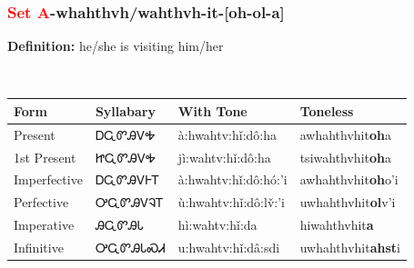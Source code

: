 \subsubsection*{\textcolor{Red}{Set A}{-}\textbf{whahthvh/wahthvh}{-}it{-}[oh-ol-a]}
\nopagebreak
\textbf{Definition: } he/she is visiting him/her
\\[0.5em]
\begin{tabularx}{\textwidth}{l X X X}%
\toprule%
\textbf{Form}&\textbf{Syllabary}&\textbf{With Tone}&\textbf{Toneless}\\%
\midrule%
Present&ᎠᏩᏛᎯᏙᎭ&à:hwahtv:hǐ:dô:ha&awhahthvhit\textbf{oh}a\\%
1st Present&ᏥᏩᏛᎯᏙᎭ&jì:wahtv:hǐ:dô:ha&tsiwahthvhit\textbf{oh}a\\%
Imperfective&ᎠᏩᏛᎯᏙᎰᎢ&à:hwahtv:hǐ:dô:hó:’i&awhahthvhit\textbf{oh}o'i\\%
Perfective&ᎤᏩᏛᎯᏙᎸᎢ&ù:hwahtv:hǐ:dô:lv̌:’i&uwhahthvhit\textbf{ol}v'i\\%
Imperative&ᎯᏩᏛᎯᏓ&hì:wahtv:hǐ:da&hiwahthvhit\textbf{a}\\%
Infinitive&ᎤᏩᏛᎯᏓᏍᏗ&u:hwahtv:hǐ:dâ:sdi&uwhahthvhit\textbf{ahst}i\\%
\bottomrule%
\end{tabularx}
\\[1em]